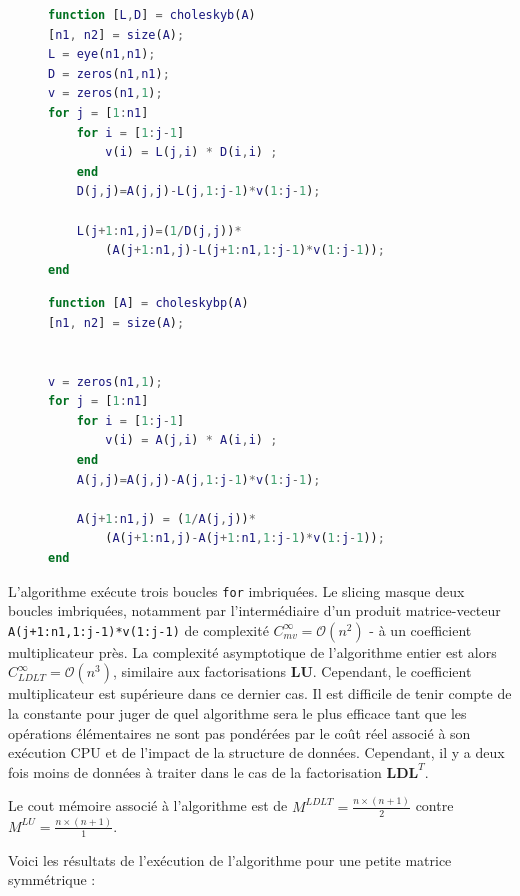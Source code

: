 \documentclass[12pt]{report}
\begin{document}
\begin{figure}[H]
\begin{minipage}{0.5\textwidth}
\begin{lstlisting}[language=Matlab, caption=Factorisation LDLT d'une matrice symmétrique réelle]
function [L,D] = choleskyb(A)
[n1, n2] = size(A); 
L = eye(n1,n1);
D = zeros(n1,n1);
v = zeros(n1,1);
for j = [1:n1]
    for i = [1:j-1]
        v(i) = L(j,i) * D(i,i) ; 
    end
    D(j,j)=A(j,j)-L(j,1:j-1)*v(1:j-1);

    L(j+1:n1,j)=(1/D(j,j))*
		(A(j+1:n1,j)-L(j+1:n1,1:j-1)*v(1:j-1)); 
end
\end{lstlisting}
\end{minipage}
\begin{minipage}{0.499\textwidth}
\begin{lstlisting}[language=Matlab, caption=Factorisation LDLT en place d'une matrice symmétrique réelle]
function [A] = choleskybp(A)
[n1, n2] = size(A); 


v = zeros(n1,1);
for j = [1:n1]
    for i = [1:j-1]
        v(i) = A(j,i) * A(i,i) ; 
    end
    A(j,j)=A(j,j)-A(j,1:j-1)*v(1:j-1);

    A(j+1:n1,j) = (1/A(j,j))*
		(A(j+1:n1,j)-A(j+1:n1,1:j-1)*v(1:j-1)); 
end
\end{lstlisting}
\end{minipage}
\end{figure}

L'algorithme exécute trois boucles \texttt{for} imbriquées. Le slicing masque deux boucles imbriquées, notamment par l'intermédiaire d'un produit matrice-vecteur \texttt{A(j+1:n1,1:j-1)*v(1:j-1)} de complexité $C_{mv}^{\infty} = \mathcal{O}(n^2)$ - à un coefficient multiplicateur près. La complexité asymptotique de l'algorithme entier est alors $C_{LDLT}^{\infty} = \mathcal{O}(n^3)$, similaire aux factorisations $\mathbf{LU}$. Cependant, le coefficient multiplicateur est supérieure dans ce dernier cas. Il est difficile de tenir compte de la constante pour juger de quel algorithme sera le plus efficace tant que les opérations élémentaires ne sont pas pondérées par le coût réel associé à son exécution CPU et de l'impact de la structure de données. Cependant, il y a deux fois moins de données à traiter dans le cas de la factorisation $\mathbf{LDL}^T$. 

Le cout mémoire associé à l'algorithme est de $M^{LDLT} = \frac{n \times (n+1)}{2}$ contre $M^{LU} = \frac{n \times (n+1)}{1}$.

Voici les résultats de l'exécution de l'algorithme pour une petite matrice symmétrique :
\end{document}
